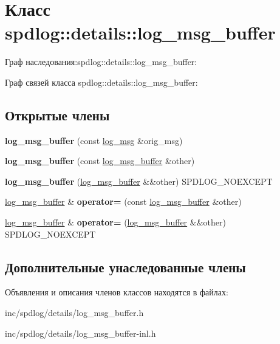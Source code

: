 \hypertarget{classspdlog_1_1details_1_1log__msg__buffer}{}\section{Класс spdlog\+:\+:details\+:\+:log\+\_\+msg\+\_\+buffer}
\label{classspdlog_1_1details_1_1log__msg__buffer}


Граф наследования\+:spdlog\+:\+:details\+:\+:log\+\_\+msg\+\_\+buffer\+:


Граф связей класса spdlog\+:\+:details\+:\+:log\+\_\+msg\+\_\+buffer\+:
\subsection*{Открытые члены}
\begin{DoxyCompactItemize}
\item 
\mbox{\label{classspdlog_1_1details_1_1log__msg__buffer_af79e17eab1804d4e38a6177bf38030be}} 
{\bfseries log\+\_\+msg\+\_\+buffer} (const \hyperlink{structspdlog_1_1details_1_1log__msg}{log\+\_\+msg} \&orig\+\_\+msg)
\item 
\mbox{\label{classspdlog_1_1details_1_1log__msg__buffer_a34c7b25a2f6155d2e3469298bb6c7015}} 
{\bfseries log\+\_\+msg\+\_\+buffer} (const \hyperlink{classspdlog_1_1details_1_1log__msg__buffer}{log\+\_\+msg\+\_\+buffer} \&other)
\item 
\mbox{\label{classspdlog_1_1details_1_1log__msg__buffer_afcd332ab43a18e2a8cc515343c9c188a}} 
{\bfseries log\+\_\+msg\+\_\+buffer} (\hyperlink{classspdlog_1_1details_1_1log__msg__buffer}{log\+\_\+msg\+\_\+buffer} \&\&other) S\+P\+D\+L\+O\+G\+\_\+\+N\+O\+E\+X\+C\+E\+PT
\item 
\mbox{\label{classspdlog_1_1details_1_1log__msg__buffer_a37ce73906d0ff8d28fc88e0c99bd8a83}} 
\hyperlink{classspdlog_1_1details_1_1log__msg__buffer}{log\+\_\+msg\+\_\+buffer} \& {\bfseries operator=} (const \hyperlink{classspdlog_1_1details_1_1log__msg__buffer}{log\+\_\+msg\+\_\+buffer} \&other)
\item 
\mbox{\label{classspdlog_1_1details_1_1log__msg__buffer_a6bc9c2d438b883c8e736f7a8cabc3f2e}} 
\hyperlink{classspdlog_1_1details_1_1log__msg__buffer}{log\+\_\+msg\+\_\+buffer} \& {\bfseries operator=} (\hyperlink{classspdlog_1_1details_1_1log__msg__buffer}{log\+\_\+msg\+\_\+buffer} \&\&other) S\+P\+D\+L\+O\+G\+\_\+\+N\+O\+E\+X\+C\+E\+PT
\end{DoxyCompactItemize}
\subsection*{Дополнительные унаследованные члены}


Объявления и описания членов классов находятся в файлах\+:\begin{DoxyCompactItemize}
\item 
inc/spdlog/details/log\+\_\+msg\+\_\+buffer.\+h\item 
inc/spdlog/details/log\+\_\+msg\+\_\+buffer-\/inl.\+h\end{DoxyCompactItemize}

